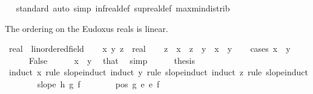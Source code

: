 \begin{isabellebody}
\isanewline
{}\isamarkupfalse%
%
\isadelimproof
\ %
\endisadelimproof
%
\isatagproof
{}\isamarkupfalse%
\ standard\ {\isacharparenleft}{\kern0pt}auto\ simp{\isacharcolon}{\kern0pt}\ inf{\isacharunderscore}{\kern0pt}real{\isacharunderscore}{\kern0pt}def\ sup{\isacharunderscore}{\kern0pt}real{\isacharunderscore}{\kern0pt}def\ max{\isacharunderscore}{\kern0pt}min{\isacharunderscore}{\kern0pt}distrib{}{\isacharparenright}{\kern0pt}%
\endisatagproof
{\isafoldproof}%
%
\isadelimproof
%
\endisadelimproof
\isanewline
\isanewline
{}\isamarkupfalse%
%
\begin{isamarkuptext}%
The ordering on the Eudoxus reals is linear.%
\end{isamarkuptext}\isamarkuptrue%
\isamarkupfalse%
\ real\ {\isacharcolon}{\kern0pt}{\isacharcolon}{\kern0pt}\ linordered{\isacharunderscore}{\kern0pt}field\isanewline
%
\isadelimproof
%
\endisadelimproof
%
\isatagproof
{}\isamarkupfalse%
\isanewline
\ \ \isamarkupfalse%
\ x\ y\ z\ {\isacharcolon}{\kern0pt}{\isacharcolon}{\kern0pt}\ real\isanewline
\ \ \isamarkupfalse%
\ {\isachardoublequoteopen}z\ {\isacharplus}{\kern0pt}\ x\ {\isasymle}\ z\ {\isacharplus}{\kern0pt}\ y{\isachardoublequoteclose}\ \ {\isachardoublequoteopen}x\ {\isasymle}\ y{\isachardoublequoteclose}\isanewline
\ \ \isamarkupfalse%
\ {\isacharparenleft}{\kern0pt}cases\ {\isachardoublequoteopen}x\ {\isacharequal}{\kern0pt}\ y{\isachardoublequoteclose}{\isacharparenright}{\kern0pt}\isanewline
\ \ \ \ \isamarkupfalse%
\ False\isanewline
\ \ \ \ \isamarkupfalse%
\ {\isachardoublequoteopen}x\ {\isacharless}{\kern0pt}\ y{\isachardoublequoteclose}\ \isamarkupfalse%
\ that\ \isamarkupfalse%
\ simp\isanewline
\ \ \ \ \isamarkupfalse%
\ {\isacharquery}{\kern0pt}thesis\isanewline
\ \ \ \ \isamarkupfalse%
\ {\isacharparenleft}{\kern0pt}induct\ x\ rule{\isacharcolon}{\kern0pt}\ slope{\isacharunderscore}{\kern0pt}induct{\isacharcomma}{\kern0pt}\ induct\ y\ rule{\isacharcolon}{\kern0pt}\ slope{\isacharunderscore}{\kern0pt}induct{\isacharcomma}{\kern0pt}\ induct\ z\ rule{\isacharcolon}{\kern0pt}\ slope{\isacharunderscore}{\kern0pt}induct{\isacharparenright}{\kern0pt}\isanewline
\ \ \ \ \ \ \isamarkupfalse%
\ {\isacharparenleft}{\kern0pt}slope\ h\ g\ f{\isacharparenright}{\kern0pt}\isanewline
\ \ \ \ \ \ \isamarkupfalse%
\ {\isachardoublequoteopen}pos\ {\isacharparenleft}{\kern0pt}g\ {\isacharplus}{\kern0pt}\isactrlsub e\ {\isacharparenleft}{\kern0pt}{\isacharminus}{\kern0pt}\isactrlsub e\ f{\isacharparenright}{\kern0pt}{\isacharparenright}{\kern0pt}{\isachardoublequoteclose}\ \isamarkupfalse%

\end{isabellebody}
